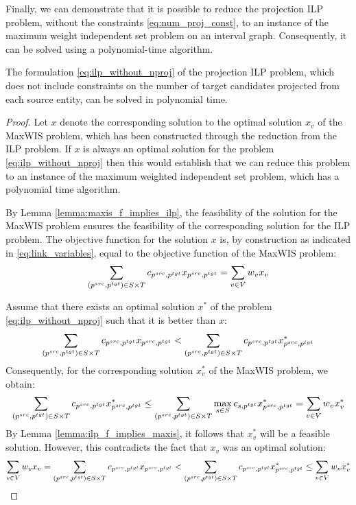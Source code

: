 Finally, we can demonstrate that it is possible to reduce the projection ILP problem, without the
constraints \eqref{eq:num_proj_const}, to an instance of the maximum weight
independent set problem on an interval graph. Consequently, it can be solved using a polynomial-time
algorithm.
\begin{theorem}
  The formulation \eqref{eq:ilp_without_nproj} of the projection ILP problem,
  which does not include constraints on the number of target candidates projected
  from each source entity, can be solved in polynomial time.
\end{theorem}
\begin{proof}
  Let \( x \) denote the corresponding solution to the optimal solution \( x_v \) of
  the MaxWIS problem, which has been constructed through the reduction from the ILP
  problem. If \( x \) is always an optimal solution for the problem
  \eqref{eq:ilp_without_nproj} then this would establish that we can reduce this
  problem to an instance of the maximum weighted independent set problem, which has a
  polynomial time algorithm.

  By Lemma \ref{lemma:maxis_f_implies_ilp}, the feasibility of the solution for the
  MaxWIS problem ensures the feasibility of the corresponding solution for the ILP
  problem. The objective function for the solution \( x \) is, by construction as
  indicated in \eqref{eq:link_variables}, equal to the objective function of the
  MaxWIS problem:
  \[
    \sum\limits_{(p^{src}, p^{tgt}) \in S \times T} c_{p^{src}, p^{tgt}} x_{p^{src}, p^{tgt}} =
    \sum\limits_{v \in V} w_v x_v
  \]

  Assume that there exists an optimal solution \( x^* \) of the problem \eqref{eq:ilp_without_nproj}
  such that it is better than \( x \):
  \[
    \sum\limits_{(p^{src}, p^{tgt}) \in S \times T} c_{p^{src}, p^{tgt}} x_{p^{src}, p^{tgt}} <
    \sum\limits_{(p^{src}, p^{tgt}) \in S \times T} c_{p^{src}, p^{tgt}} x^*_{p^{src}, p^{tgt}}
  \]
  Consequently, for the corresponding solution \( x^*_v \) of the MaxWIS problem, we obtain:
  \[
    \sum\limits_{(p^{src}, p^{tgt}) \in S \times T} c_{p^{src}, p^{tgt}} x^*_{p^{src}, p^{tgt}} \leq
    \sum\limits_{(p^{src}, p^{tgt}) \in S \times T} \max\limits_{s \in S} c_{s, p^{tgt}} x^*_{p^{src}, p^{tgt}} =
    \sum\limits_{v \in V} w_v x^*_v
  \]
  By Lemma \ref{lemma:ilp_f_implies_maxis}, it follows that \( x^*_v \) will be a
  feasible solution. However, this contradicts the fact that \( x_v \) was an optimal
  solution:
  \[
    \sum\limits_{v \in V} w_v x_v =
    \sum\limits_{(p^{src}, p^{tgt}) \in S \times T} c_{p^{src}, p^{tgt}} x_{p^{src}, p^{tgt}} <
    \sum\limits_{(p^{src}, p^{tgt}) \in S \times T} c_{p^{src}, p^{tgt}} x^*_{p^{src}, p^{tgt}} \leq
    \sum\limits_{v \in V} w_v x^*_v
  \]
\end{proof}


